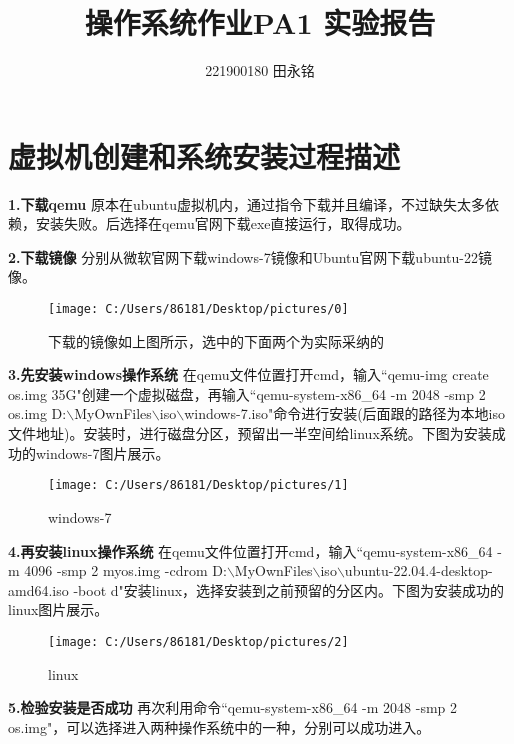 \documentclass[]{report}
\title{操作系统作业PA1 实验报告}
\author{221900180 田永铭}
\begin{document}
\maketitle

\section{虚拟机创建和系统安装过程描述}

{\bf 1.下载qemu} 原本在ubuntu虚拟机内，通过指令下载并且编译，不过缺失太多依赖，安装失败。后选择在qemu官网下载exe直接运行，取得成功。

{\bf 2.下载镜像} 分别从微软官网下载windows-7镜像和Ubuntu官网下载ubuntu-22镜像。

\begin{figure}[h!]
	\centering
	\texttt{[image: C:/Users/86181/Desktop/pictures/0]}
	\caption{下载的镜像如上图所示，选中的下面两个为实际采纳的}
	\label{fig:0}
\end{figure}

{\bf 3.先安装windows操作系统} 在qemu文件位置打开cmd，输入``qemu-img create os.img 35G"创建一个虚拟磁盘，再输入``qemu-system-x86\_64 -m 2048 -smp 2 os.img D:$\backslash$MyOwnFiles$\backslash$iso$\backslash$windows-7.iso"命令进行安装(后面跟的路径为本地iso文件地址)。安装时，进行磁盘分区，预留出一半空间给linux系统。下图为安装成功的windows-7图片展示。
\begin{figure}[h!]
	\centering
	\texttt{[image: C:/Users/86181/Desktop/pictures/1]}
	\caption{windows-7}
	\label{fig:1}
\end{figure}

{\bf 4.再安装linux操作系统}
在qemu文件位置打开cmd，输入``qemu-system-x86\_64 -m 4096 -smp 2 myos.img -cdrom D:$\backslash$MyOwnFiles$\backslash$iso$\backslash$ubuntu-22.04.4-desktop-amd64.iso -boot d"安装linux，选择安装到之前预留的分区内。下图为安装成功的linux图片展示。

\begin{figure}[h!]
	\centering
	\texttt{[image: C:/Users/86181/Desktop/pictures/2]}
	\caption{linux}
	\label{fig:2}
\end{figure}


{\bf 5.检验安装是否成功} 再次利用命令``qemu-system-x86\_64 -m 2048 -smp 2 os.img"，可以选择进入两种操作系统中的一种，分别可以成功进入。\\\\\\\\\\\\\\\\\\\
\end{document}
